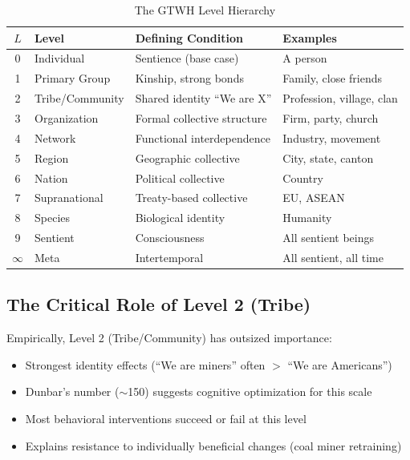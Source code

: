\documentclass[12pt,a4paper]{article}
\begin{document}
\begin{table}[htbp]
\centering
\caption{The GTWH Level Hierarchy}
\label{tab:hierarchy}
\renewcommand{\arraystretch}{1.3}
\begin{tabular}{@{}clll@{}}
\toprule
$L$ & \textbf{Level} & \textbf{Defining Condition} & \textbf{Examples} \\
\midrule
0 & Individual & Sentience (base case) & A person \\
1 & Primary Group & Kinship, strong bonds & Family, close friends \\
2 & Tribe/Community & Shared identity ``We are X'' & Profession, village, clan \\
3 & Organization & Formal collective structure & Firm, party, church \\
4 & Network & Functional interdependence & Industry, movement \\
5 & Region & Geographic collective & City, state, canton \\
6 & Nation & Political collective & Country \\
7 & Supranational & Treaty-based collective & EU, ASEAN \\
8 & Species & Biological identity & Humanity \\
9 & Sentient & Consciousness & All sentient beings \\
$\infty$ & Meta & Intertemporal & All sentient, all time \\
\bottomrule
\end{tabular}
\end{table}

\subsection{The Critical Role of Level 2 (Tribe)}

Empirically, Level 2 (Tribe/Community) has outsized importance:
\begin{itemize}[nosep]
\item Strongest identity effects (``We are miners'' often $>$ ``We are Americans'')
\item Dunbar's number ($\sim$150) suggests cognitive optimization for this scale
\item Most behavioral interventions succeed or fail at this level
\item Explains resistance to individually beneficial changes (coal miner retraining)
\end{itemize}

\end{document}
